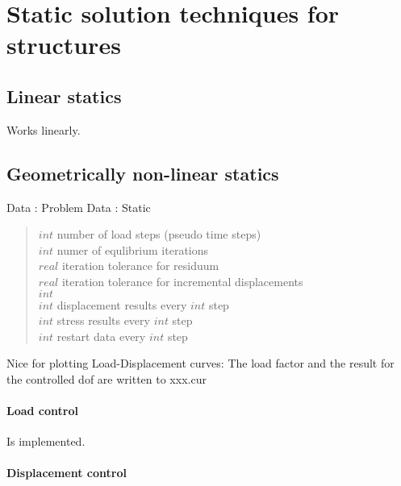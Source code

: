 



\chapter{Static solution techniques for structures}
\label{struct_statics:chap}

\section{Linear statics}
Works linearly.



\section{Geometrically non-linear statics}
Data : Problem Data : Static

\begin{quote}
 $int$ number of load steps (pseudo time steps)\\
 $int$ numer of equlibrium iterations\\
 $real$ iteration tolerance for residuum\\
 $real$ iteration tolerance for incremental
displacements\\
 $int$\\
 $int$ displacement results every $int$ step\\
 $int$ stress results every $int$ step\\
 $int$ restart data every $int$ step\\
\end{quote}

 Nice for plotting Load-Displacement curves: The load factor and
  the result for the controlled dof are written to xxx.cur
\subsubsection{Load control}
Is implemented.

\subsubsection{Displacement control}


